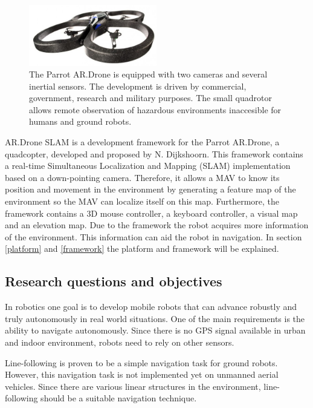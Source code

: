 \documentclass[a4paper]{article}
\begin{document}
\begin{figure}[!ht]
	\centering
	\includegraphics[width=0.5\textwidth]{images/ardrone.jpg}
	\caption{The Parrot AR.Drone is equipped with two cameras and several inertial sensors. The development is driven by commercial, government, research and military purposes. The small quadrotor allows remote observation of hazardous environments inaccesible for humans and ground robots.}
	\label{ardrone}
\end{figure}

AR.Drone SLAM \cite{Dijkshoorn2012} is a development framework for the Parrot AR.Drone, a quadcopter, developed and proposed by N. Dijkshoorn. This framework contains a real-time Simultaneous Localization and Mapping (SLAM) implementation based on a down-pointing camera. Therefore, it allows a MAV to know its position and movement in the environment by generating a feature map of the environment so the MAV can localize itself on this map. Furthermore, the framework contains a 3D mouse controller, a keyboard controller, a visual map and an elevation map. Due to the framework the robot acquires more information of the environment. This information can aid the robot in navigation. In section \ref{platform} and \ref{framework} the platform and framework will be explained.

\subsection{Research questions and objectives}
In robotics one goal is to develop mobile robots that can advance robustly and truly autonomously in real world situations. One of the main requirements is the ability to navigate autonomously. Since there is no GPS signal available in urban and indoor environment, robots need to rely on other sensors.

Line-following is proven to be a simple navigation task for ground robots. However, this navigation task is not implemented yet on unmanned aerial vehicles. Since there are various linear structures in the environment, line-following should be a suitable navigation technique.
\end{document}
